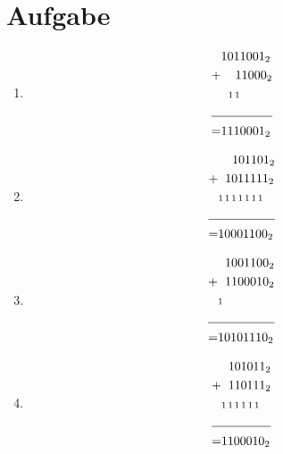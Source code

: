 \documentclass[DIN, pagenumber=false, fontsize=11pt, parskip=half]{scrartcl}
\begin{document}
    \section{Aufgabe}
    \begin{enumerate}[label = (\alph*)]
        \item 
            \begin{align*}
                & {1011001}_2 \\
                + & \hspace{0.4cm} {11000}_2  \\
                & \hspace{0.2cm} {\scriptstyle 1\, 1} \\
                \cline{1-2} 
                = &{1110001}_2  
            \end{align*}
        \item 
            \begin{align*}
                & \hspace{0.4cm} {101101}_2  \\
                + & \hspace{0.2cm} {1011111}_2  \\
                & {\scriptstyle1\, 1\, 1\, 1\, 1\, 1\, 1} \\
                \cline{1-2} 
                = &{10001100}_2  
            \end{align*}
        \item 
            \begin{align*}
                & \hspace{0.2cm} {1001100}_2  \\
                + & \hspace{0.2cm} {1100010}_2  \\
                &  {\scriptstyle 1} \\
                \cline{1-2} 
                = &{10101110}_2  
            \end{align*}
        \item 
            \begin{align*}
                & \hspace{0.2cm} {101011}_2  \\
                + & \hspace{0.2cm} {110111}_2  \\
                & {\scriptstyle1\, 1 \, 1 \, 1 \, 1 \, 1}\\
                \cline{1-2} 
                = &{1100010}_2  
            \end{align*}
    \end{enumerate}
\end{document}
